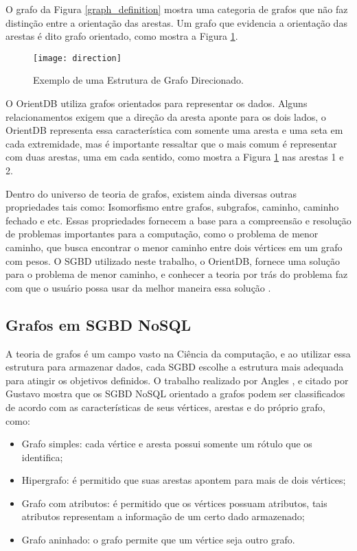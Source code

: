 	O grafo da Figura \ref{graph_definition} mostra uma categoria de grafos que não faz distinção entre a orientação das arestas. Um grafo que evidencia a orientação das arestas é dito grafo orientado, como mostra a Figura \ref{graph_direction}.
	
\begin{figure}[H]
	\centering
    \texttt{[image: direction]}
    \caption{Exemplo de uma Estrutura de Grafo Direcionado.}
    \label{graph_direction}
\end{figure}

	O OrientDB utiliza grafos orientados para representar os dados. Alguns relacionamentos exigem que a direção da aresta aponte para os dois lados, o OrientDB representa essa característica com somente uma aresta e uma seta em cada extremidade, mas é importante ressaltar que o mais comum é representar com duas arestas, uma em cada sentido, como mostra a Figura \ref{graph_direction} nas arestas 1 e 2.
	
	Dentro do universo de teoria de grafos, existem ainda diversas outras propriedades tais como: Isomorfismo entre grafos, subgrafos, caminho, caminho fechado e etc. Essas propriedades fornecem a base para a compreensão e resolução de problemas importantes para a computação, como o problema de menor caminho, que busca encontrar o menor caminho entre dois vértices em um grafo com pesos. O SGBD utilizado neste trabalho, o OrientDB, fornece uma solução para o problema de menor caminho, e conhecer a teoria por trás do problema faz com que o usuário possa usar da melhor maneira essa solução \cite{orientShortestPath}.
	
\subsection{Grafos em SGBD NoSQL}
	A teoria de grafos é um campo vasto na Ciência da computação, e ao utilizar essa estrutura para armazenar dados, cada SGBD escolhe a estrutura mais adequada para atingir os objetivos definidos. O trabalho realizado por Angles \cite{angles2012comparison}, e citado por Gustavo \cite{mdgnosql} mostra que os SGBD NoSQL orientado a grafos podem ser classificados de acordo com as características de seus vértices, arestas e do próprio grafo, como:
\begin{itemize}
		\item Grafo simples: cada vértice e aresta possui somente um rótulo que os identifica;
		\item Hipergrafo: é permitido que suas arestas apontem para mais de dois vértices;
		\item Grafo com atributos: é permitido que os vértices possuam atributos, tais atributos representam a informação de um certo dado armazenado;
		\item Grafo aninhado: o grafo permite que um vértice seja outro grafo.
\end{itemize}

